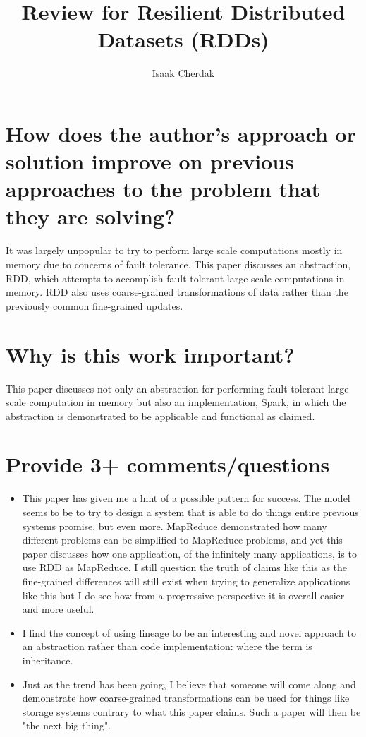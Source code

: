 \documentclass{article}
\title{Review for Resilient Distributed Datasets (RDDs)}
\author{Isaak Cherdak}
\begin{document}
\maketitle

\section{How does the author's approach or solution improve on previous
approaches to the problem that they are solving?}

It was largely unpopular to try to perform large scale computations mostly in
memory due to concerns of fault tolerance. This paper discusses an abstraction,
RDD, which attempts to accomplish fault tolerant large scale computations in
memory. RDD also uses coarse-grained transformations of data rather than the
previously common fine-grained updates.

\section{Why is this work important?}

This paper discusses not only an abstraction for performing fault tolerant large
scale computation in memory but also an implementation, Spark, in which the
abstraction is demonstrated to be applicable and functional as claimed.

\section{Provide 3+ comments/questions}

\begin{itemize}
  \item This paper has given me a hint of a possible pattern for success. The
    model seems to be to try to design a system that is able to do things entire
    previous systems promise, but even more. MapReduce demonstrated how many
    different problems can be simplified to MapReduce problems, and yet this
    paper discusses how one application, of the infinitely many applications, is
    to use RDD as MapReduce. I still question the truth of claims like this as
    the fine-grained differences will still exist when trying to generalize
    applications like this but I do see how from a progressive perspective it is
    overall easier and more useful.
  \item I find the concept of using lineage to be an interesting and novel
    approach to an abstraction rather than code implementation: where the term
    is inheritance.
  \item Just as the trend has been going, I believe that someone will come along
    and demonstrate how coarse-grained transformations can be used for things
    like storage systems contrary to what this paper claims. Such a paper will
    then be "the next big thing".
\end{itemize}
\end{document}

